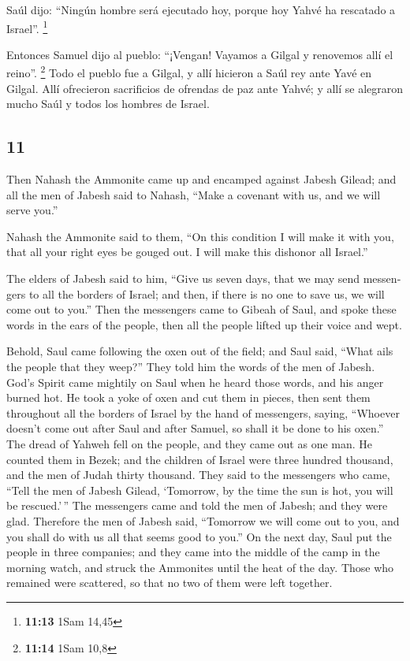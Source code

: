 \begin{paracol}{2}
 Saúl dijo: ``Ningún hombre será ejecutado hoy, porque
hoy Yahvé ha rescatado a Israel''. \footnote{\textbf{11:13} 1Sam 14,45}

 Entonces Samuel dijo al pueblo: ``¡Vengan! Vayamos a
Gilgal y renovemos allí el reino''. \footnote{\textbf{11:14} 1Sam 10,8}
 Todo el pueblo fue a Gilgal, y allí hicieron a Saúl rey
ante Yavé en Gilgal. Allí ofrecieron sacrificios de ofrendas de paz ante
Yahvé; y allí se alegraron mucho Saúl y todos los hombres de Israel.

\switchcolumn
\begin{otherlanguage}{english}

\hypertarget{section-21}{%
\section{11}\label{section-21}}

 Then Nahash the Ammonite came up and encamped against
Jabesh Gilead; and all the men of Jabesh said to Nahash, ``Make a
covenant with us, and we will serve you.''

 Nahash the Ammonite said to them, ``On this condition I
will make it with you, that all your right eyes be gouged out. I will
make this dishonor all Israel.''

 The elders of Jabesh said to him, ``Give us seven days,
that we may send messengers to all the borders of Israel; and then, if
there is no one to save us, we will come out to you.'' 
Then the messengers came to Gibeah of Saul, and spoke these words in the
ears of the people, then all the people lifted up their voice and wept.

 Behold, Saul came following the oxen out of the field;
and Saul said, ``What ails the people that they weep?'' They told him
the words of the men of Jabesh.  God's Spirit came
mightily on Saul when he heard those words, and his anger burned hot.
 He took a yoke of oxen and cut them in pieces, then sent
them throughout all the borders of Israel by the hand of messengers,
saying, ``Whoever doesn't come out after Saul and after Samuel, so shall
it be done to his oxen.'' The dread of Yahweh fell on the people, and
they came out as one man.  He counted them in Bezek; and
the children of Israel were three hundred thousand, and the men of Judah
thirty thousand.  They said to the messengers who came,
``Tell the men of Jabesh Gilead, `Tomorrow, by the time the sun is hot,
you will be rescued.'\,'' The messengers came and told the men of
Jabesh; and they were glad.  Therefore the men of Jabesh
said, ``Tomorrow we will come out to you, and you shall do with us all
that seems good to you.''  On the next day, Saul put the
people in three companies; and they came into the middle of the camp in
the morning watch, and struck the Ammonites until the heat of the day.
Those who remained were scattered, so that no two of them were left
together.


\end{otherlanguage}
\end{paracol}
